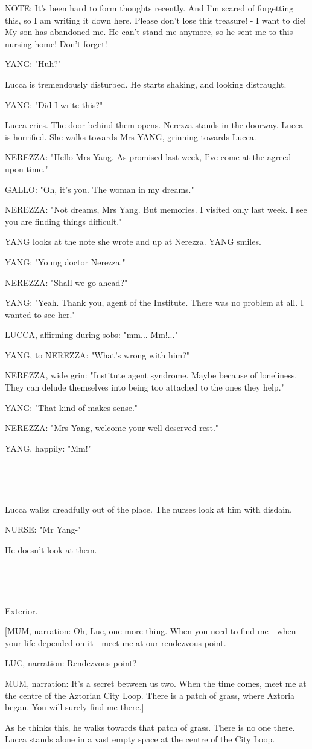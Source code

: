 \documentclass[11pt]{article}
\begin{document}
NOTE: It's been hard to form thoughts recently. 
And I'm scared of forgetting this, so I am writing it down here.
Please don't lose this treasure! - I want to die!
My son has abandoned me.
He can't stand me anymore, so he sent me to this nursing home!
Don't forget!

YANG: "Huh?"

Lucca is tremendously disturbed.
He starts shaking, and looking distraught.

YANG: "Did I write this?"

Lucca cries.
The door behind them opens. 
Nerezza stands in the doorway.
Lucca is horrified.
She walks towards Mrs YANG, grinning towards Lucca.

NEREZZA: "Hello Mrs Yang. 
As promised last week, I've come at the agreed upon time."

GALLO: "Oh, it's you.
The woman in my dreams."

NEREZZA: "Not dreams, Mrs Yang.
But memories.
I visited only last week.
I see you are finding things difficult."

YANG looks at the note she wrote and up at Nerezza.
YANG smiles.

YANG: "Young doctor Nerezza."

NEREZZA: "Shall we go ahead?"

YANG: "Yeah. 
Thank you, agent of the Institute.
There was no problem at all.
I wanted to see her."

LUCCA, affirming during sobs: "mm... Mm!..."

YANG, to NEREZZA: "What's wrong with him?"

NEREZZA, wide grin: "Institute agent syndrome.
Maybe because of loneliness.
They can delude themselves into being too attached to the ones they help."

YANG: "That kind of makes sense."

NEREZZA: "Mrs Yang, welcome your well deserved rest."

YANG, happily: "Mm!"

\ 

\ 

Lucca walks dreadfully out of the place.
The nurses look at him with disdain.

NURSE: "Mr Yang-"

He doesn't look at them.

\ 

\ 

Exterior.

[MUM, narration: Oh, Luc, one more thing.
When you need to find me - when your life depended on it - meet me at our rendezvous point.

LUC, narration: Rendezvous point?

MUM, narration: It's a secret between us two. 
When the time comes, meet me at the centre of the Aztorian City Loop.
There is a patch of grass, where Aztoria began.
You will surely find me there.]

As he thinks this, he walks towards that patch of grass.
There is no one there.
Lucca stands alone in a vast empty space at the centre of the City Loop.
\end{document}

